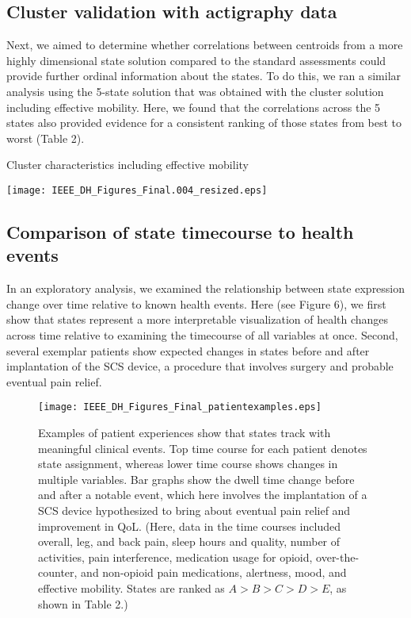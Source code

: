 \documentclass[conference]{IEEEtran}
\begin{document}
\subsection{Cluster validation with actigraphy data} 
Next, we aimed to determine whether correlations between centroids from a more highly dimensional state solution compared to the standard assessments could provide further ordinal information about the states. To do this, we ran a similar analysis using the 5-state solution that was obtained with the cluster solution including effective mobility. Here, we found that the correlations across the 5 states also provided evidence for a consistent ranking of those states from best to worst (Table 2). 

\begin{table}[htbp]
\caption{Cluster characteristics including effective mobility}
\centerline{\texttt{[image: IEEE\_DH\_Figures\_Final.004\_resized.eps]}}
\label{fig}
\end{table}

\subsection{Comparison of state timecourse to health events}
In an exploratory analysis, we examined the relationship between state expression change over time relative to known health events. Here (see Figure 6), we first show that states represent a more interpretable visualization of health changes across time relative to examining the timecourse of all variables at once. Second, several exemplar patients show expected changes in states before and after implantation of the SCS device, a procedure that involves surgery and probable eventual pain relief. 

\begin{figure}[htbp]
\centerline{\texttt{[image: IEEE\_DH\_Figures\_Final\_patientexamples.eps]}}
\caption{Examples of patient experiences show that states track with meaningful clinical events. Top time course for each patient denotes state assignment, whereas lower time course shows changes in multiple variables. Bar graphs show the dwell time change before and after a notable event, which here involves the implantation of a SCS device hypothesized to bring about eventual pain relief and improvement in QoL. (Here, data in the time courses included overall, leg, and back pain, sleep hours and quality, number of activities, pain interference, medication usage for opioid, over-the-counter, and non-opioid pain medications, alertness, mood, and effective mobility. States are ranked as $A>B>C>D>E$, as shown in Table 2.)}
\label{fig}
\end{figure}
\end{document}
